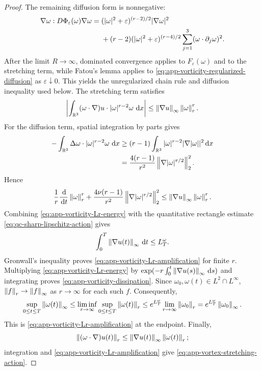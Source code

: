 \begin{proof}
The remaining diffusion form is nonnegative:
\begin{align}
 \nabla\omega:D\Phi_\varepsilon(\omega)\nabla\omega
 ={}&(|\omega|^2+\varepsilon)^{(r-2)/2}|\nabla\omega|^2
 \notag\\
 &+(r-2)(|\omega|^2+\varepsilon)^{(r-4)/2}
 \sum_{j=1}^3(\omega\cdot\partial_j\omega)^2.
 \label{eq:app-vorticity-regularized-diffusion}
\end{align}
After the limit \(R\to\infty\), dominated convergence applies to
\(F_\varepsilon(\omega)\) and to the stretching term, while Fatou's lemma
applies to \eqref{eq:app-vorticity-regularized-diffusion} as
\(\varepsilon\downarrow0\).  This yields the unregularized chain rule and
diffusion inequality used below.  The stretching term
satisfies
\[
 \left|\int_{\mathbb R^3}(\omega\cdot\nabla)u\cdot
       |\omega|^{r-2}\omega\,\,\mathrm d x\right|
 \le\left\lVert \nabla u\right\rVert_\infty\left\lVert \omega\right\rVert_r^r.
\]
For the diffusion term, spatial integration by parts gives
\begin{align*}
 -\int_{\mathbb R^3}\Delta\omega\cdot|\omega|^{r-2}\omega\,\,\mathrm d x
 &\ge(r-1)\int_{\mathbb R^3}|\omega|^{r-2}|\nabla|\omega||^2\,\mathrm d x\\
 &=\frac{4(r-1)}{r^2}
   \left\lVert \nabla|\omega|^{r/2}\right\rVert_2^2.
\end{align*}
Hence
\begin{equation}
 \frac1r\frac{\,\mathrm d}{\,\mathrm d t}\left\lVert \omega\right\rVert_r^r
 +\frac{4\nu(r-1)}{r^2}
   \left\lVert \nabla|\omega|^{r/2}\right\rVert_2^2
 \le\left\lVert \nabla u\right\rVert_\infty\left\lVert \omega\right\rVert_r^r.
 \label{eq:app-vorticity-Lr-energy}
\end{equation}
Combining \eqref{eq:app-vorticity-Lr-energy} with the quantitative rectangle
estimate \eqref{eq:qc-sharp-lipschitz-action} gives
\[
 \int_0^T\left\lVert \nabla u(t)\right\rVert_\infty\,\mathrm d t\le L_T^\omega.
\]
Gronwall's inequality proves
\eqref{eq:app-vorticity-Lr-amplification} for finite \(r\).  Multiplying
\eqref{eq:app-vorticity-Lr-energy} by
\(
 \exp(-r\int_0^t\left\lVert \nabla u(s)\right\rVert_\infty\,\mathrm d s)
\)
and integrating proves \eqref{eq:app-vorticity-dissipation}.  Since
\(\omega_0,\omega(t)\in L^2\cap L^\infty\),
\(\left\lVert f\right\rVert_r\to\left\lVert f\right\rVert_\infty\) as \(r\to\infty\) for each such \(f\).
Consequently,
\[
 \sup_{0\le t\le T}\left\lVert \omega(t)\right\rVert_\infty
 \le\liminf_{r\to\infty}
      \sup_{0\le t\le T}\left\lVert \omega(t)\right\rVert_r
 \le e^{L_T^\omega}\lim_{r\to\infty}\left\lVert \omega_0\right\rVert_r
 =e^{L_T^\omega}\left\lVert \omega_0\right\rVert_\infty.
\]
This is \eqref{eq:app-vorticity-Lr-amplification} at the endpoint.  Finally,
\[
 \left\lVert (\omega\cdot\nabla)u(t)\right\rVert_r
 \le\left\lVert \nabla u(t)\right\rVert_\infty\left\lVert \omega(t)\right\rVert_r;
\]
integration and \eqref{eq:app-vorticity-Lr-amplification} give
\eqref{eq:app-vortex-stretching-action}.
\end{proof}

